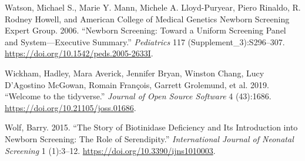 \documentclass[review]{elsarticle}
\begin{document}
\begin{hangparas}{1.5em}{1}
\hypertarget{citeproc_bib_item_9}{Watson, Michael S., Marie Y. Mann, Michele A. Lloyd-Puryear, Piero Rinaldo, R. Rodney Howell, and American College of Medical Genetics Newborn Screening Expert Group. 2006. “Newborn Screening: Toward a Uniform Screening Panel and System—Executive Summary.” \textit{Pediatrics} 117 (Supplement\_3):S296–307. \href{https://doi.org/10.1542/peds.2005-2633I}{https://doi.org/10.1542/peds.2005-2633I}.}

\hypertarget{citeproc_bib_item_10}{Wickham, Hadley, Mara Averick, Jennifer Bryan, Winston Chang, Lucy D’Agostino McGowan, Romain François, Garrett Grolemund, et al. 2019. “Welcome to the tidyverse.” \textit{Journal of Open Source Software} 4 (43):1686. \href{https://doi.org/10.21105/joss.01686}{https://doi.org/10.21105/joss.01686}.}

\hypertarget{citeproc_bib_item_11}{Wolf, Barry. 2015. “The Story of Biotinidase Deficiency and Its Introduction into Newborn Screening: The Role of Serendipity.” \textit{International Journal of Neonatal Screening} 1 (1):3–12. \href{https://doi.org/10.3390/ijns1010003}{https://doi.org/10.3390/ijns1010003}.}
\end{hangparas}
\end{document}
